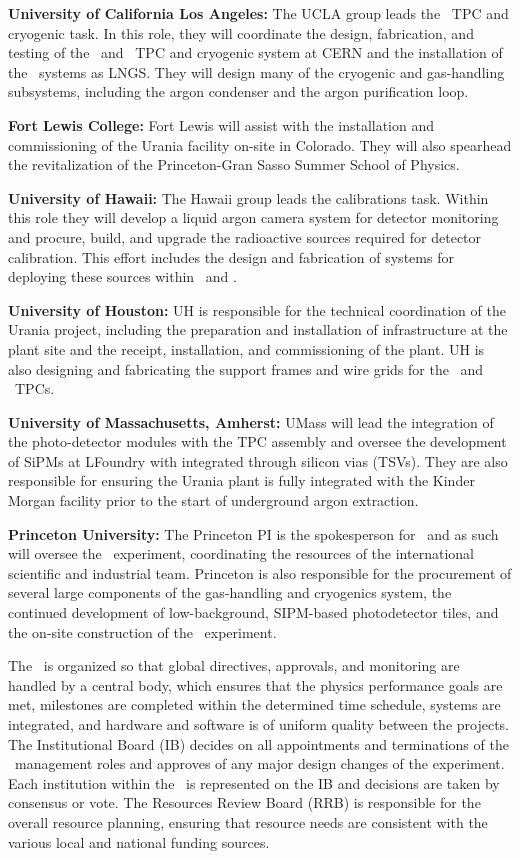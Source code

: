 {\bf University of California Los Angeles:} The UCLA group leads the \DSks\ TPC and cryogenic task. In this role, they will coordinate  the design, fabrication, and testing of the \DSps\ and \DSks\ TPC and cryogenic system at CERN and the installation of the \DSks\ systems as LNGS. They will design many of the cryogenic and gas-handling subsystems, including the argon condenser and the argon purification loop.

{\bf Fort Lewis College:} Fort Lewis will assist with the installation and commissioning of the Urania facility on-site in Colorado. They will also spearhead the revitalization of the Princeton-Gran Sasso Summer School of Physics.

{\bf University of Hawaii:} The Hawaii group leads the calibrations task. Within this role they will develop a liquid argon camera system for detector monitoring and procure, build, and upgrade the radioactive sources required for detector calibration. This effort includes the design and fabrication of systems for deploying these sources within \DSps\ and \DSks.

{\bf University of Houston:} UH is responsible for the technical coordination of the Urania project, including the preparation and installation of infrastructure at the plant site and the receipt, installation, and commissioning of the plant. UH is also designing and fabricating the support frames and wire grids for the \DSps\ and \DSks\ TPCs.

{\bf University of Massachusetts, Amherst:} UMass will lead the integration of the photo-detector modules with the TPC assembly and oversee the development of SiPMs at LFoundry with integrated through silicon vias (TSVs). They are also responsible for ensuring the Urania plant is fully integrated with the Kinder Morgan facility prior to the start of underground argon extraction.

{\bf Princeton University:} The Princeton PI is the spokesperson for \DS\ and as such will oversee the \DSks\ experiment, coordinating the resources of the international scientific and industrial team. Princeton is also responsible for the procurement of several large components of the gas-handling and cryogenics system, the continued development of low-background, SIPM-based photodetector tiles, and the on-site construction of the \DSks\ experiment.



The \GADMC\ is organized so that global directives, approvals, and monitoring are handled by a central body, which ensures that the physics performance goals are met, milestones are completed within the determined time schedule, systems are integrated, and hardware and software is of uniform quality between the projects. The Institutional Board (IB) decides on all appointments and terminations of the \DS\ management roles and approves of any major design changes of the experiment. Each institution within the \GADMC\ is represented on the IB and decisions are taken by consensus or vote. The Resources Review Board (RRB) is responsible for the overall resource planning, ensuring that resource needs are consistent with the various local and national funding sources.

